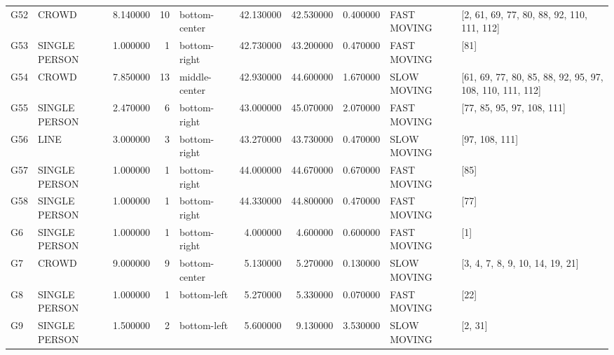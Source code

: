 \begin{table}
\begin{tabular}{llrrlrrrll}
G52 & CROWD & 8.140000 & 10 & bottom-center & 42.130000 & 42.530000 & 0.400000 & FAST MOVING & [2, 61, 69, 77, 80, 88, 92, 110, 111, 112] \\
G53 & SINGLE PERSON & 1.000000 & 1 & bottom-right & 42.730000 & 43.200000 & 0.470000 & FAST MOVING & [81] \\
G54 & CROWD & 7.850000 & 13 & middle-center & 42.930000 & 44.600000 & 1.670000 & SLOW MOVING & [61, 69, 77, 80, 85, 88, 92, 95, 97, 108, 110, 111, 112] \\
G55 & SINGLE PERSON & 2.470000 & 6 & bottom-right & 43.000000 & 45.070000 & 2.070000 & FAST MOVING & [77, 85, 95, 97, 108, 111] \\
G56 & LINE & 3.000000 & 3 & bottom-right & 43.270000 & 43.730000 & 0.470000 & SLOW MOVING & [97, 108, 111] \\
G57 & SINGLE PERSON & 1.000000 & 1 & bottom-right & 44.000000 & 44.670000 & 0.670000 & FAST MOVING & [85] \\
G58 & SINGLE PERSON & 1.000000 & 1 & bottom-right & 44.330000 & 44.800000 & 0.470000 & FAST MOVING & [77] \\
G6 & SINGLE PERSON & 1.000000 & 1 & bottom-right & 4.000000 & 4.600000 & 0.600000 & FAST MOVING & [1] \\
G7 & CROWD & 9.000000 & 9 & bottom-center & 5.130000 & 5.270000 & 0.130000 & SLOW MOVING & [3, 4, 7, 8, 9, 10, 14, 19, 21] \\
G8 & SINGLE PERSON & 1.000000 & 1 & bottom-left & 5.270000 & 5.330000 & 0.070000 & FAST MOVING & [22] \\
G9 & SINGLE PERSON & 1.500000 & 2 & bottom-left & 5.600000 & 9.130000 & 3.530000 & SLOW MOVING & [2, 31] \\
\bottomrule
\end{tabular}
\end{table}

